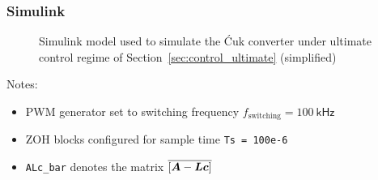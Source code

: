 \subsubsection{\textsf{Simulink}}
\begin{figure}[H]
    \centering
    \caption{\textsf{Simulink} model used to simulate the \'{C}uk converter under ultimate control regime of Section~\ref{sec:control_ultimate} (simplified)}
    \label{fig:simulink}
\end{figure}
Notes:
\begin{itemize}
    \item PWM generator set to switching frequency $f_\text{switching} = 100 \ \mathsf{kHz}$
    \item ZOH blocks configured for sample time \texttt{Ts = 100e-6}
    \item \texttt{ALc\_bar} denotes the matrix $\overline{\left[\boldsymbol{A} - \boldsymbol{L}\boldsymbol{c}\right]}$
\end{itemize}
